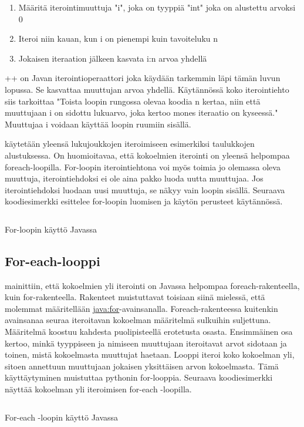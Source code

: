 \documentclass{tufte-book}
\newcommand{\java}[1]{\underline{\gls{java:#1}}}
\newcommand{\code}[3]{
\begin{listing}
    \inputminted{java}{OhjelmointiopasEsimerkit/src/#1/#2.java}
    \caption{#3}
    \label{Java-#1-#2}
\end{listing}
}
\begin{document}
\begin{enumerate}
	\item{}Määritä iterointimuuttuja "i", joka on tyyppiä "int" joka on alustettu arvoksi 0
	\item{}Iteroi niin kauan, kun i on pienempi kuin tavoiteluku n
	\item{}Jokaisen iteraation jälkeen kasvata i:n arvoa yhdellä
\end{enumerate}

++ on Javan iterointioperaattori joka käydään tarkemmin läpi tämän luvun lopussa. Se kasvattaa
muuttujan arvoa yhdellä. Käytännössä koko iterointiehto siis tarkoittaa "Toista loopin rungossa
olevaa koodia n kertaa, niin että muuttujaan i on sidottu lukuarvo, joka kertoo mones iteraatio
on kyseessä." Muuttujaa i voidaan käyttää loopin ruumiin sisällä. 

 käytetään yleensä lukujoukkojen iteroimiseen esimerkiksi taulukkojen
alustuksessa. On huomioitavaa, että kokoelmien iterointi on yleensä helpompaa foreach-loopilla.
For-loopin iterointiehtona voi myös toimia jo olemassa oleva muuttuja, iterointiehdoksi ei ole
aina pakko luoda uutta muuttujaa. Jos iterointiehdoksi luodaan uusi muuttuja, se näkyy vain
loopin sisällä. Seuraava koodiesimerkki esittelee for-loopin luomisen ja käytön perusteet
käytännössä.

\code{week3/basicexamples}{ForLoop}{For-loopin käyttö Javassa}

\subsection{For-each-looppi}
\label{for each}

 mainittiin, että kokoelmien yli iterointi on Javassa
helpompaa foreach-rakenteella, kuin for-rakenteella. Rakenteet muistuttavat toisiaan siinä
mielessä, että molemmat määritellään \java{for}-avainsanalla. Foreach-rakenteessa kuitenkin
avainsanaa seuraa iteroitavan kokoelman määritelmä sulkuihin suljettuna. Määritelmä koostuu
kahdesta puolipisteellä erotetusta osasta. Ensimmäinen osa kertoo, minkä tyyppiseen ja nimiseen
muuttujaan iteroitavat arvot sidotaan ja toinen, mistä kokoelmasta muuttujat haetaan. Looppi
iteroi koko kokoelman yli, sitoen annettuun muuttujaan jokaisen yksittäisen arvon kokoelmasta.
Tämä käyttäytyminen muistuttaa pythonin for-looppia. Seuraava koodiesimerkki näyttää kokoelman
yli iteroimisen for-each -loopilla.

\code{week3/basicexamples}{ForEachLoop}{For-each -loopin käyttö Javassa}
\end{document}
